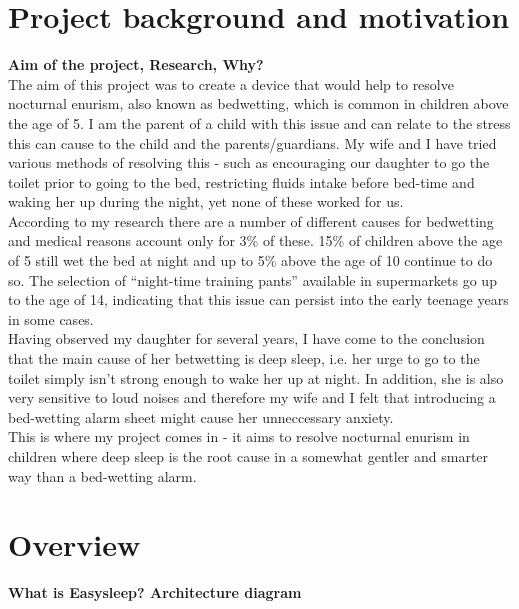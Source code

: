 \documentclass[12pt,a4paper]{article}
\begin{document}
	\section{Project background and motivation}
	{\bfseries Aim of the project, Research, Why?}\\
	
	The aim of this project was to create a device that would help to resolve nocturnal enurism, also known as bedwetting, which is common in children above the age of 5. I am the parent of a child with this issue and can relate to the stress this can cause to the child and the parents/guardians. My wife and I have tried various methods of resolving this - such as encouraging our daughter to go the toilet prior to going to the bed, restricting fluids intake before bed-time and waking her up during the night, yet none of these worked for us.\\
	
	According to my research there are a number of different causes for bedwetting and medical reasons account only for 3\% of these. 15\% of children above the age of 5 still wet the bed at night and up to 5\% above the age of 10 continue to do so. The selection of ``night-time training pants'' available in supermarkets go up to the age of 14, indicating that this issue can persist into the early teenage years in some cases.\\
	
	Having observed my daughter for several years, I have come to the conclusion that the main cause of her betwetting is deep sleep, i.e. her urge to go to the toilet simply isn't strong enough to wake her up at night. In addition, she is also very sensitive to loud noises and therefore my wife and I felt that introducing a bed-wetting alarm sheet might cause her unneccessary anxiety.\\
	
	This is where my project comes in - it aims to resolve nocturnal enurism in children 
	where deep sleep is the root cause in a somewhat gentler and smarter way than a bed-wetting
	alarm. 
	\newpage
	
	\section{Overview}
	{\bfseries What is Easysleep? Architecture diagram}\\
	
\end{document}
